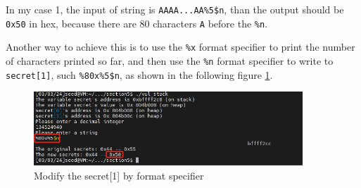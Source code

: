 \documentclass[a4paper,11pt]{article}
\begin{document}
In my case 1, the input of string is \verb|AAAA...AA%5$n|, than the output should be \verb|0x50| in hex, because there are 80 characters \verb|A| before the \verb|%n|.

Another way to achieve this is to use the \verb|%x| format specifier to print the number of characters printed so far, and then use the \verb|%n| format specifier to write to \verb|secret[1]|, such \verb|%80x%5$n|, as shown in the following figure \ref{fig:task25-2}.
\begin{figure}[h]
    \centering
       \includegraphics[width=0.9\textwidth]{figures/task25/task25-2.png}
    \caption{Modify the secret[1] by format specifier}\label{fig:task25-2}
\end{figure}


%
\end{document}
